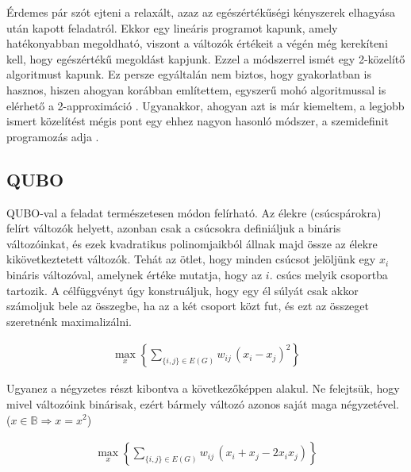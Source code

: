 Érdemes pár szót ejteni a relaxált, azaz az egészértékűségi kényszerek elhagyása után kapott feladatról. Ekkor egy lineáris programot kapunk, amely hatékonyabban megoldható, viszont a változók értékeit a végén még kerekíteni kell, hogy egészértékű megoldást kapjunk. Ezzel a módszerrel ismét egy 2-közelítő algoritmust kapunk. Ez persze egyáltalán nem biztos, hogy gyakorlatban is hasznos, hiszen ahogyan korábban említettem, egyszerű mohó algoritmussal is elérhető a 2-approximáció \cite{10.5555/1283383.1283390, POLJAK1994191}.
Ugyanakkor, ahogyan azt is már kiemeltem, a legjobb ismert közelítést mégis pont egy ehhez nagyon hasonló módszer, a szemidefinit programozás adja \cite{10.1145/227683.227684}.


\subsection{QUBO}\label{sec:theoryMaxCutQUBO}

QUBO-val a feladat természetesen módon felírható. Az élekre (csúcspárokra) felírt változók helyett, azonban csak a csúcsokra definiáljuk a bináris változóinkat, és ezek kvadratikus polinomjaikból állnak majd össze az élekre kikövetkeztetett változók. Tehát az ötlet, hogy minden csúcsot jelöljünk egy $x_i$ bináris változóval, amelynek értéke mutatja, hogy az $i.$ csúcs melyik csoportba tartozik. A célfüggvényt úgy konstruáljuk, hogy egy él súlyát csak akkor számoljuk bele az összegbe, ha az a két csoport közt fut, és ezt az összeget szeretnénk maximalizálni.

\begin{align}
	\max_{x} \left\{ \sum_{\{i,j\} \in E(G)}{w_{ij} \, (x_i-x_j)^2}\right\}
\end{align}

Ugyanez a négyzetes részt kibontva a következőképpen alakul. Ne felejtsük, hogy mivel változóink binárisak, ezért bármely változó azonos saját maga négyzetével. ($x \in \mathbb{B} \Rightarrow x = x^2$)

\begin{align}
	\max_{x} \left\{ \sum_{\{i,j\} \in E(G)}{w_{ij} \, (x_i+x_j-2 x_i x_j)}\right\}
\end{align}


